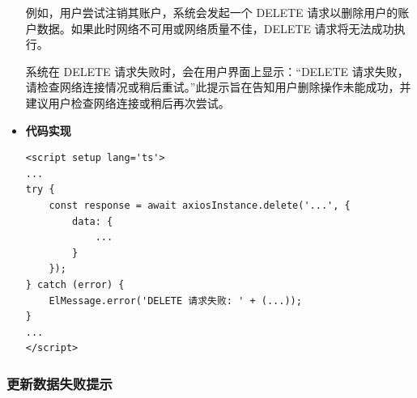\begin{itemize}
	例如，用户尝试注销其账户，系统会发起一个 DELETE 请求以删除用户的账户数据。如果此时网络不可用或网络质量不佳，DELETE 请求将无法成功执行。
	
	系统在 DELETE 请求失败时，会在用户界面上显示：“DELETE 请求失败，请检查网络连接情况或稍后重试。”此提示旨在告知用户删除操作未能成功，并建议用户检查网络连接或稍后再次尝试。
	
	\item \textbf{代码实现}
	
	\begin{verbatim}
<script setup lang='ts'>
...
try {
	const response = await axiosInstance.delete('...', {
		data: {
			...
		}
	});
} catch (error) {
	ElMessage.error('DELETE 请求失败: ' + (...));
}
...
</script>
	\end{verbatim}
\end{itemize}

\subsubsection{更新数据失败提示}


